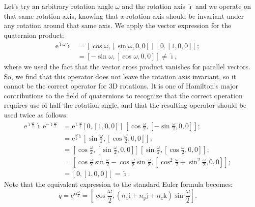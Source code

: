 Let's try an arbitrary rotation angle $\omega$ and the rotation axis $\hat{\mathrm{\imath}}$ and we operate on that same rotation axis, knowing that a rotation axis should be invariant under any rotation around that same axis.  We apply the vector expression for the quaternion product:
\begin{equation}
\begin{split}
	\mathrm{e}^{\hat{\mathrm{\imath}}\omega} \hat{\mathrm{\imath}} &= \left[\cos\omega,[\sin\omega,0,0]\right]\,\left[0,[1,0,0]\right];\\
	& = \left[-\sin\omega, [\cos\omega,0,0]\right] \ne \hat{\mathrm{\imath}},
\end{split}
\end{equation}
where we used the fact that the vector cross product vanishes for parallel vectors.  So, we find that this operator does not leave the rotation axis invariant, so it cannot be the correct operator for 3D rotations.  It is one of Hamilton's major contributions to the field of quaternions to recognize that the correct operation requires use of half the rotation angle, and that the resulting operator should be used twice as follows:
\begin{equation}
\begin{split}
	\mathrm{e}^{ \hat{\mathrm{\imath}}\frac{\omega}{2}}\, \hat{\mathrm{\imath}}\,\mathrm{e}^{- \hat{\mathrm{\imath}}\frac{\omega}{2}} &=
	\mathrm{e}^{ \hat{\mathrm{\imath}}\frac{\omega}{2}} \left[0,[1,0,0]\right]\,\left[\cos\frac{\omega}{2},[-\sin\frac{\omega}{2},0,0]\right];\\
	&=\mathrm{e}^{\frac{\omega}{2} \hat{\mathrm{\imath}}} \left[\sin\frac{\omega}{2},[\cos\frac{\omega}{2},0,0]\right];\\
	&= \left[\cos\frac{\omega}{2},[\sin\frac{\omega}{2},0,0]\right] \left[\sin\frac{\omega}{2},[\cos\frac{\omega}{2},0,0]\right];\\
	&=\left[ \cos\frac{\omega}{2}\sin\frac{\omega}{2}-\cos\frac{\omega}{2}\sin\frac{\omega}{2}, [ \cos^2\frac{\omega}{2}+ \sin^2\frac{\omega}{2},0,0]\right];\\
	&= \left[0,[1,0,0]\right] = \hat{\mathrm{\imath}}.
\end{split}
\end{equation}
Note that the equivalent expression to the standard Euler formula becomes:
\begin{equation}
	q = \mathrm{e}^{\hat{\mathbf{n}}\frac{\omega}{2}} = \left[\cos\frac{\omega}{2},(n_x\mathrm{i}+n_y \mathrm{j}+n_z \mathrm{k})\sin\frac{\omega}{2}\right].\label{\chabbr:eq:quatrot}
\end{equation}

